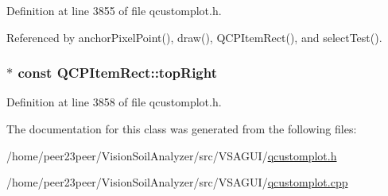 Definition at line 3855 of file qcustomplot.\+h.



Referenced by anchor\+Pixel\+Point(), draw(), Q\+C\+P\+Item\+Rect(), and select\+Test().

\hypertarget{class_q_c_p_item_rect_a77e0eb6e4aa6efee620d35e2c21bdad7}{}
\subsubsection[{top\+Right}]{$\ast$ const Q\+C\+P\+Item\+Rect\+::top\+Right}\label{class_q_c_p_item_rect_a77e0eb6e4aa6efee620d35e2c21bdad7}


Definition at line 3858 of file qcustomplot.\+h.



The documentation for this class was generated from the following files\+:\begin{DoxyCompactItemize}
\item 
/home/peer23peer/\+Vision\+Soil\+Analyzer/src/\+V\+S\+A\+G\+U\+I/\hyperlink{qcustomplot_8h}{qcustomplot.\+h}\item 
/home/peer23peer/\+Vision\+Soil\+Analyzer/src/\+V\+S\+A\+G\+U\+I/\hyperlink{qcustomplot_8cpp}{qcustomplot.\+cpp}\end{DoxyCompactItemize}
